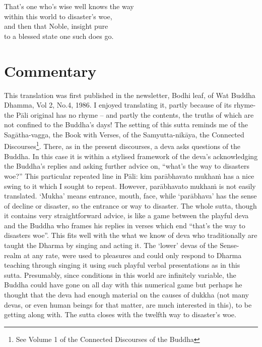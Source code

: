 \begin{MyDescription}{}
That's one who's wise well knows the way\\
within this world to disaster's woe,\\
and then that Noble, insight pure\\
to a blessed state one such does go.
\end{MyDescription}

\begin{MyDescription}[(Sn. 91-115)]{}
\end{MyDescription}
\newpage
\section{Commentary}
   
   This translation was first published in the newsletter, Bodhi leaf, of Wat Buddha Dhamma, Vol 2, No.4, 1986. I enjoyed translating it, partly because of its rhyme- the P\=ali original has no rhyme – and partly the contents, the truths of which are not confined to the Buddha's days! The setting of this sutta reminds me of the Sag\=atha-vagga, the Book with Verses, of the Samyutta-nik\=aya, the Connected Discourses\footnote{See Volume 1 of the Connected Discourses of the Buddha}. There, as in the present discourses, a deva asks questions of the Buddha. In this case it is within a stylised framework of the deva's acknowledging the Buddha's replies and asking further advice on, “what's the way to disasters woe?” This particular repeated line in P\=ali: kim par\=abhavato mukhaṁ has a nice swing to it which I sought to repeat. However, par\=abhavato mukhaṁ is not easily translated. `Mukha' means entrance, mouth, face, while `par\=abhava'  has the sense of decline or disaster, so the entrance or way to disaster. The whole sutta, though it contains very straightforward advice, is like a game between the playful deva and the Buddha who frames his replies in verses which end “that's the way to disasters woe”. This fits well with the what we know of deva who traditionally are taught the Dharma by singing and acting it. The `lower' devas of the Sense- realm at any rate, were used to pleasures and could only respond to Dharma teaching through singing it using such playful verbal presentations as in this sutta. Presumably, since conditions in this world are infinitely variable, the Buddha could have gone on all day with this numerical game but perhaps he thought that the deva had enough material on the causes of dukkha (not many devas, or even human beings for that matter, are much interested in this), to be getting along with. The sutta closes with the twelfth way to disaster's woe.

